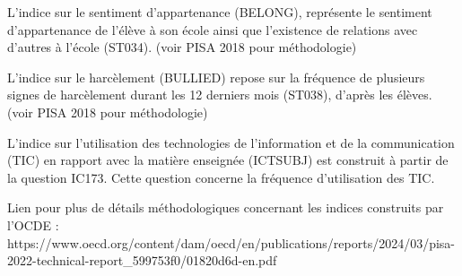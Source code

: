 \documentclass[
  french,
  11pt,
  a4paper,
  oneside]{report}
\begin{document}
L'indice sur le sentiment d'appartenance (BELONG), représente le
sentiment d'appartenance de l'élève à son école ainsi que l'existence de
relations avec d'autres à l'école (ST034). (voir PISA 2018 pour
méthodologie)

L'indice sur le harcèlement (BULLIED) repose sur la fréquence de
plusieurs signes de harcèlement durant les 12 derniers mois (ST038),
d'après les élèves. (voir PISA 2018 pour méthodologie)

L'indice sur l'utilisation des technologies de l'information et de la
communication (TIC) en rapport avec la matière enseignée (ICTSUBJ) est
construit à partir de la question IC173. Cette question concerne la
fréquence d'utilisation des TIC.

Lien pour plus de détails méthodologiques concernant les indices
construits par l'OCDE :
https://www.oecd.org/content/dam/oecd/en/publications/reports/2024/03/pisa-2022-technical-report\_599753f0/01820d6d-en.pdf
\end{document}
